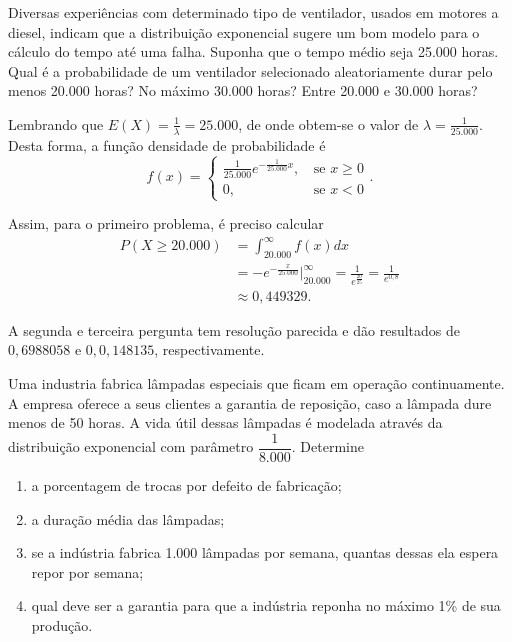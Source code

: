 \documentclass[11pt,fleqn]{book}
\numberwithin{mpicture}{chapter}
\numberwithin{mtable}{chapter}
\numberwithin{mframe}{chapter}
\begin{document}
\begin{example}
	Diversas experiências com determinado tipo de ventilador, usados em motores a diesel, indicam que a distribuição exponencial sugere um bom modelo para o cálculo do tempo até uma falha. Suponha que o tempo médio seja 25.000 horas. Qual é a probabilidade de um ventilador selecionado aleatoriamente durar pelo menos 20.000 horas? No máximo 30.000 horas? Entre 20.000 e 30.000 horas?
	
	Lembrando que $E(X)=\frac{1}{\lambda}=25.000$, de onde obtem-se o valor de $\lambda=\frac{1}{25.000}$. Desta forma, a função densidade de probabilidade é
	\[
		f(x)=\begin{cases}
			\frac{1}{25.000}e^{-\frac{1}{25.000}x}\text{,}&\text{ se }x\geqslant 0\\
			0\text{,}&\text{ se }x<0
		\end{cases}
		\text{.}
	\]
	
	Assim, para o primeiro problema, é preciso calcular
	\begin{align*}
		P(X\geqslant 20.000)&=\int_{20.000}^{\infty} f(x) dx\\
							&=-e^{-\frac{x}{25.000}}\Big|_{20.000}^{\infty} = \frac{1}{e^{\frac{20}{25}}} = \frac{1}{e^{0,8}}\\
							&\approx 0,449329\text{.}
	\end{align*}
	
	A segunda e terceira pergunta tem resolução parecida e dão resultados de $0,6988058$ e $0,0,148135$, respectivamente.
\end{example}

\begin{pageWidthArea}
	\begin{exerciseArea}
		\item Uma industria fabrica lâmpadas especiais que ficam em operação continuamente. A empresa oferece a seus clientes a garantia de reposição, caso a lâmpada dure menos de 50 horas. A vida útil dessas lâmpadas é modelada através da distribuição exponencial com parâmetro $\dfrac{1}{8.000}$. Determine
	
		\begin{enumerate}[label=(\alph*)]
			\item a porcentagem de trocas por defeito de fabricação;
			\item a duração média das lâmpadas;
			\item se a indústria fabrica 1.000 lâmpadas por semana, quantas dessas ela espera repor por semana;
			\item qual deve ser a garantia para que a indústria reponha no máximo 1\% de sua produção.
		\end{enumerate}
	\end{exerciseArea}
\end{pageWidthArea}
\end{document}

